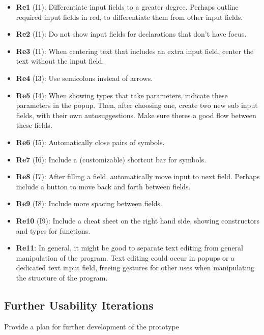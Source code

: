 \begin{itemize}
    \item \textbf{Re1} (I1): Differentiate input fields to a greater degree. Perhaps outline required input fields in red, to differentiate them from other input fields.
    \item \textbf{Re2} (I1): Do not show input fields for declarations that don’t have focus.
    \item \textbf{Re3} (I1): When centering text that includes an extra input field, center the text without the input field. 
    \item \textbf{Re4} (I3): Use semicolons instead of arrows.
    \item \textbf{Re5} (I4): When showing types that take parameters, indicate these parameters in the popup. Then, after choosing one, create two new sub input fields, with their own autosuggestions. Make sure theres a good flow between these fields.
    \item \textbf{Re6} (I5): Automatically close pairs of symbols.
    \item \textbf{Re7} (I6): Include a (customizable) shortcut bar for symbols.
    \item \textbf{Re8} (I7): After filling a field, automatically move input to next field. Perhaps include a button to move back and forth between fields.
    \item \textbf{Re9} (I8): Include more spacing between fields.
    \item \textbf{Re10} (I9): Include a cheat sheet on the right hand side, showing constructors and types for functions.
    \item \textbf{Re11}: In general, it might be good to separate text editing from general manipulation of the program. Text editing could occur in popups or a dedicated text input field, freeing gestures for other uses when manipulating the structure of the program.
\end{itemize}


\subsection{Further Usability Iterations}
Provide a plan for further development of the prototype

